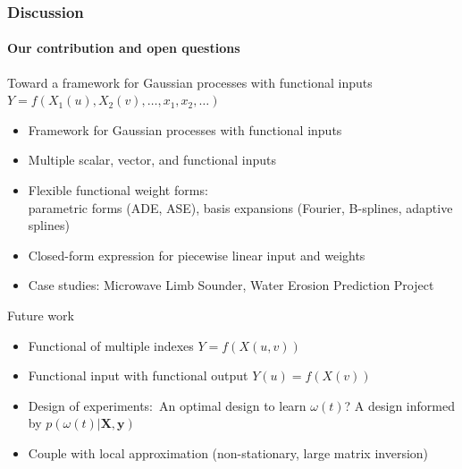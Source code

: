 \documentclass{snedecorbeamer}
\begin{document}
\begin{frame}
  \frametitle{Discussion}
  \framesubtitle{Our contribution and open questions}

  Toward a framework for Gaussian processes with functional inputs
  $Y = f(X_1(u), X_2(v), \dots, x_1, x_2, \dots)$
  \begin{itemize}
    \footnotesize
  \item Framework for Gaussian processes with functional inputs
  \item Multiple scalar, vector, and functional inputs
  \item Flexible functional weight forms: \\
    parametric forms (ADE, ASE),
    basis expansions (Fourier, B-splines, adaptive splines)
  \item Closed-form expression for piecewise linear input and weights
  \item Case studies: Microwave Limb Sounder, Water Erosion Prediction Project
  \end{itemize}
  \vspace{3ex}

  Future work
  \begin{itemize}
    \footnotesize
  \item Functional of multiple indexes $Y = f(X(u, v))$
  \item Functional input with functional output $Y(u) = f(X(v))$
  \item Design of experiments:~An optimal design to learn $\omega(t)$?
    A design informed by $p(\omega(t) | \mathbf{X}, \mathbf{y})$
  \item Couple with local approximation (non-stationary, large matrix inversion)
  \end{itemize}
\end{frame}
\end{document}
